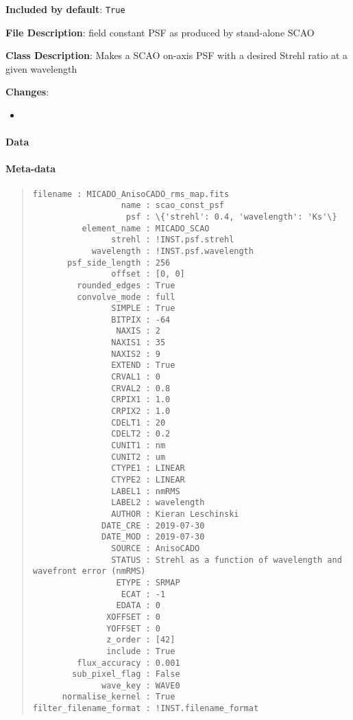 \textbf{Included by default}: \texttt{True}

\textbf{File Description}: field constant PSF as produced by stand-alone SCAO

\textbf{Class Description}: Makes a SCAO on-axis PSF with a desired Strehl ratio at a given wavelength

\textbf{Changes}:

\begin{itemize}
\item \end{itemize}


\paragraph{Data%
  \label{id1}%
}


\paragraph{Meta-data%
  \label{id2}%
}

\begin{quote}
\begin{alltt}
\begin{lstlisting}[frame=single]
              filename : MICADO_AnisoCADO_rms_map.fits
                  name : scao_const_psf
                   psf : \{'strehl': 0.4, 'wavelength': 'Ks'\}
          element_name : MICADO_SCAO
                strehl : !INST.psf.strehl
            wavelength : !INST.psf.wavelength
       psf_side_length : 256
                offset : [0, 0]
         rounded_edges : True
         convolve_mode : full
                SIMPLE : True
                BITPIX : -64
                 NAXIS : 2
                NAXIS1 : 35
                NAXIS2 : 9
                EXTEND : True
                CRVAL1 : 0
                CRVAL2 : 0.8
                CRPIX1 : 1.0
                CRPIX2 : 1.0
                CDELT1 : 20
                CDELT2 : 0.2
                CUNIT1 : nm
                CUNIT2 : um
                CTYPE1 : LINEAR
                CTYPE2 : LINEAR
                LABEL1 : nmRMS
                LABEL2 : wavelength
                AUTHOR : Kieran Leschinski
              DATE_CRE : 2019-07-30
              DATE_MOD : 2019-07-30
                SOURCE : AnisoCADO
                STATUS : Strehl as a function of wavelength and wavefront error (nmRMS)
                 ETYPE : SRMAP
                  ECAT : -1
                 EDATA : 0
               XOFFSET : 0
               YOFFSET : 0
               z_order : [42]
               include : True
         flux_accuracy : 0.001
        sub_pixel_flag : False
              wave_key : WAVE0
      normalise_kernel : True
filter_filename_format : !INST.filename_format
\end{lstlisting}
\end{alltt}
\end{quote}
